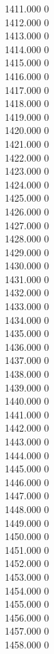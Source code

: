 { 1411.000	0 \\
 1412.000	0 \\
 1413.000	0 \\
 1414.000	0 \\
 1415.000	0 \\
 1416.000	0 \\
 1417.000	0 \\
 1418.000	0 \\
 1419.000	0 \\
 1420.000	0 \\
 1421.000	0 \\
 1422.000	0 \\
 1423.000	0 \\
 1424.000	0 \\
 1425.000	0 \\
 1426.000	0 \\
 1427.000	0 \\
 1428.000	0 \\
 1429.000	0 \\
 1430.000	0 \\
 1431.000	0 \\
 1432.000	0 \\
 1433.000	0 \\
 1434.000	0 \\
 1435.000	0 \\
 1436.000	0 \\
 1437.000	0 \\
 1438.000	0 \\
 1439.000	0 \\
 1440.000	0 \\
 1441.000	0 \\
 1442.000	0 \\
 1443.000	0 \\
 1444.000	0 \\
 1445.000	0 \\
 1446.000	0 \\
 1447.000	0 \\
 1448.000	0 \\
 1449.000	0 \\
 1450.000	0 \\
 1451.000	0 \\
 1452.000	0 \\
 1453.000	0 \\
 1454.000	0 \\
 1455.000	0 \\
 1456.000	0 \\
 1457.000	0 \\
 1458.000	0 \\
}
